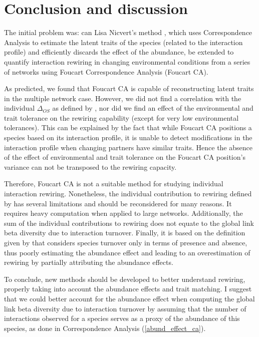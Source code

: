 \section{Conclusion and discussion}


The initial problem was: can Lisa Nicvert's method \citep{these_lisa_2024}, which uses Correspondence Analysis to estimate the latent traits of the species (related to the interaction profile) and efficiently discards the effect of the abundance, be extended to quantify interaction rewiring in changing environmental conditions from a series of networks using Foucart Correspondence Analysis (Foucart CA).

As predicted, we found that Foucart CA is capable of reconstructing latent traits in the multiple network case. However, we did not find a correlation with the individual $\Delta_{OS}$ as defined by \cite{toju_interaction_2024}, nor did we find an effect of the environmental and trait tolerance on the rewiring capability (except for very low environmental tolerances). 
This can be explained by the fact that while Foucart CA positions a species based on its interaction profile, it is unable to detect modifications in the interaction profile when changing partners have similar traits. Hence the absence of the effect of environmental and trait tolerance on the Foucart CA position's variance can not be transposed to the rewiring capacity.

Therefore, Foucart CA is not a suitable method for studying individual interaction rewiring. 
Nonetheless, the individual contribution to rewiring defined by \cite{toju_interaction_2024} has several limitations and should be reconsidered for many reasons. It requires heavy computation when applied to large networks. Additionally, the sum of the individual contributions to rewiring does not equate to the global link beta diversity due to interaction turnover. Finally, it is based on the definition given by \cite{poisot_dissimilarity_2012} that considers species turnover only in terms of presence and absence, thus poorly estimating the abundance effect and leading to an overestimation of rewiring by partially attributing the abundance effects.

To conclude, new methods should be developed to better understand rewiring, properly taking into account the abundance effects and trait matching. I suggest that we could better account for the abundance effect when computing the global link beta diversity due to interaction turnover by assuming that the number of interactions observed for a species serves as a proxy of the abundance of this species, as done in Correspondence Analysis (\ref{abund_effect_ca}).


